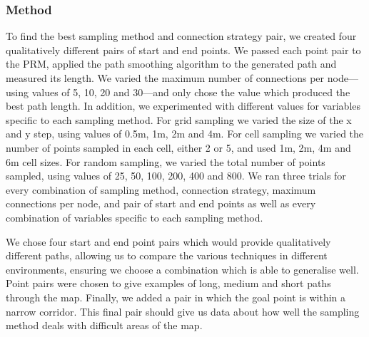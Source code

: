 \documentclass[conference]{IEEEtran}
\begin{document}
\subsubsection{Method}
To find the best sampling method and connection strategy pair, we created four qualitatively different pairs of start and end points. We passed each point pair to the PRM, applied the path smoothing algorithm to the generated path and measured its length. We varied the maximum number of connections per node---using values of 5, 10, 20 and 30---and only chose the value which produced the best path length. In addition, we experimented with different values for variables specific to each sampling method. For grid sampling we varied the size of the x and y step, using values of 0.5m, 1m, 2m and 4m. For cell sampling we varied the number of points sampled in each cell, either 2 or 5, and used 1m, 2m, 4m and 6m cell sizes. For random sampling, we varied the total number of points sampled, using values of 25, 50, 100, 200, 400 and 800. We ran three trials for every combination of sampling method, connection strategy, maximum connections per node, and pair of start and end points as well as every combination of variables specific to each sampling method.

We chose four start and end point pairs which would provide qualitatively different paths, allowing us to compare the various techniques in different environments, ensuring we choose a combination which is able to generalise well. Point pairs were chosen to give examples of long, medium and short paths through the map. Finally, we added a pair in which the goal point is within a narrow corridor. This final pair should give us data about how well the sampling method deals with difficult areas of the map.
\end{document}
